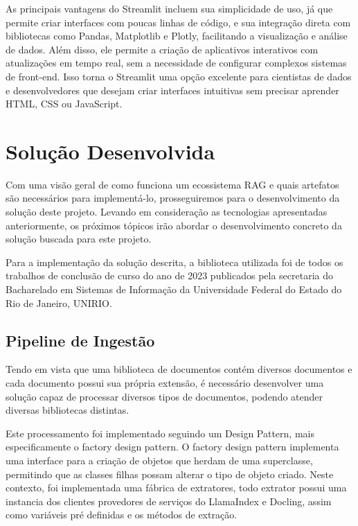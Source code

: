 \documentclass[a4paper, 12pt]{article}
\begin{document}
    As principais vantagens do Streamlit incluem sua simplicidade de uso, já que permite criar interfaces com poucas linhas de código, e sua integração direta com bibliotecas como Pandas, Matplotlib e Plotly, facilitando a visualização e análise de dados. Além disso, ele permite a criação de aplicativos interativos com atualizações em tempo real, sem a necessidade de configurar complexos sistemas de front-end. Isso torna o Streamlit uma opção excelente para cientistas de dados e desenvolvedores que desejam criar interfaces intuitivas sem precisar aprender HTML, CSS ou JavaScript.

    \clearpage

    \section{Solução Desenvolvida}

    Com uma visão geral de como funciona um ecossistema RAG e quais artefatos são necessários para implementá-lo, prosseguiremos para o desenvolvimento da solução deste projeto. Levando em consideração as tecnologias apresentadas anteriormente, os próximos tópicos irão abordar o desenvolvimento concreto da solução buscada para este projeto.

    Para a implementação da solução descrita, a biblioteca utilizada foi de todos os trabalhos de conclusão de curso do ano de 2023 publicados pela secretaria do Bacharelado em Sistemas de Informação da Universidade Federal do Estado do Rio de Janeiro, UNIRIO.

    \subsection{Pipeline de Ingestão}
    
    Tendo em vista que uma biblioteca de documentos contém diversos documentos e cada documento possui sua própria extensão, é necessário desenvolver uma solução capaz de processar diversos tipos de documentos, podendo atender diversas bibliotecas distintas.

    Este processamento foi implementado seguindo um Design Pattern, mais especificamente o factory design pattern. O factory design pattern implementa uma interface para a criação de objetos que herdam de uma superclasse, permitindo que as classes filhas possam alterar o tipo de objeto criado. Neste contexto, foi implementada uma fábrica de extratores, todo extrator possui uma instancia dos clientes provedores de serviços do LlamaIndex e Docling, assim como variáveis pré definidas e os métodos de extração. 
    
\end{document}
